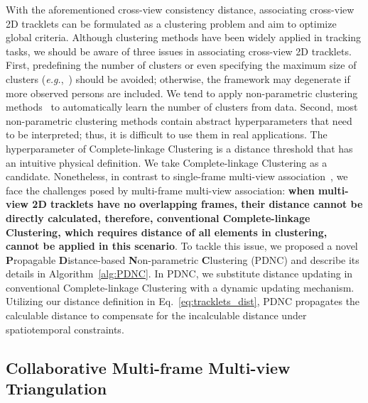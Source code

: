 \documentclass{CVM}
\newcommand{\eg}{{\it e.g.}}
\begin{document}
With the aforementioned cross-view consistency distance, associating cross-view 2D tracklets can be formulated as a clustering problem and aim to optimize global criteria. Although clustering methods have been widely applied in tracking tasks, we should be aware of three issues in associating cross-view 2D tracklets. First, predefining the number of clusters or even specifying the maximum size of clusters (\eg,~\cite{he2020multi}) should be avoided; otherwise, the framework may degenerate if more observed persons are included. We tend to apply non-parametric clustering methods~\cite{roberts1997parametric} to automatically learn the number of clusters from data. Second, most non-parametric clustering methods contain abstract hyperparameters that need to be interpreted; thus, it is difficult to use them in real applications. The hyperparameter of Complete-linkage Clustering is a distance threshold that has an intuitive physical definition. We take Complete-linkage Clustering as a candidate. Nonetheless, in contrast to single-frame multi-view association~\cite{dong2019fast,chen2020cross}, we face the challenges posed by multi-frame multi-view association: \textbf{when multi-view 2D tracklets have no overlapping frames, their distance cannot be directly calculated, therefore, conventional Complete-linkage Clustering, which requires distance of all elements in clustering, cannot be applied in this scenario}. To tackle this issue, we proposed a novel \textbf{P}ropagable \textbf{D}istance-based \textbf{N}on-parametric \textbf{C}lustering (PDNC) and describe its details in Algorithm~\ref{alg:PDNC}. In PDNC, we substitute distance updating in conventional Complete-linkage Clustering with a
dynamic updating mechanism. Utilizing our distance definition in Eq.~\eqref{eq:tracklets_dist}, PDNC propagates the calculable distance to compensate for the incalculable distance under spatiotemporal constraints.

 



\subsection{Collaborative Multi-frame Multi-view Triangulation}
\label{sec:CMMT}
\end{document}
